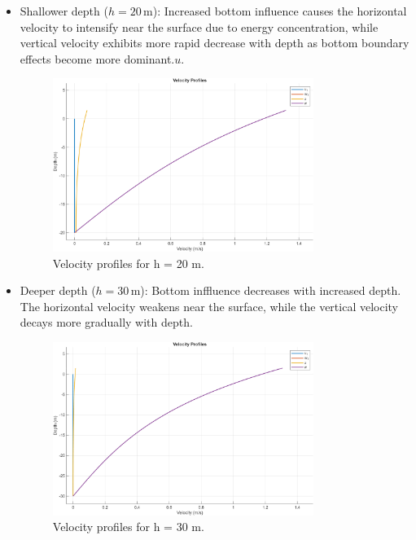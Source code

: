 \documentclass[a4paper]{article}
\begin{document}
\begin{itemize}  
    \item {Shallower depth (\( h = 20 \, \text{m} \))}: Increased bottom influence causes the horizontal velocity to intensify near the surface due to energy concentration, while vertical velocity exhibits more rapid decrease with depth as bottom boundary effects become more dominant.\( u \). 
    \begin{figure}[H]
        \centering
        \includegraphics[width=0.8\textwidth]{CE591HW1-Q1c1.png}
        \caption{\small Velocity profiles for h = 20 m.}
        \label{fig:plot2c_1}
    \end{figure} 
    \item {Deeper depth (\( h = 30 \, \text{m} \))}: Bottom inffluence decreases with increased depth. The horizontal velocity weakens near the surface, while the vertical velocity decays more gradually with depth. 
    \begin{figure}[H]
        \centering
        \includegraphics[width=0.8\textwidth]{CE591HW1-Q1c2.png}
        \caption{\small Velocity profiles for h = 30 m.}
        \label{fig:plot2c_2}
    \end{figure} 
\end{itemize}  
\vspace{0.5cm}
\end{document}
